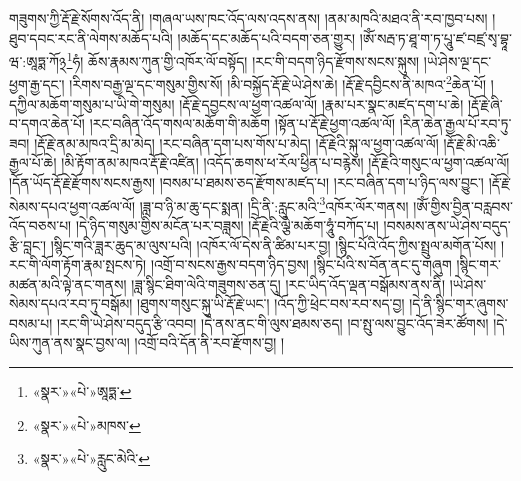 གཟུགས་ཀྱི་རྡོ་རྗེ་སོགས་འོད་ནི། །གཞལ་ཡས་ཁང་འོད་ལས་འདས་ནས། །ནམ་མཁའི་མཐའ་ནི་རབ་ཁྱབ་པས། །ཐུབ་དབང་རང་ནི་ལེགས་མཆོད་པའི། །མཆོད་དང་མཆོད་པའི་བདག་ཅན་གྱུར། །ཨོཾ་སརྦ་ཏ་ཐཱ་ག་ཏ་པཱུ་ཛ་བཛྲ་སྭ་བྷཱ་ཝ་:ཨཱཏྨ་ཀོ྅\footnote{«སྣར་»«པེ་»ཨཱཏྨ་}ཧཾ། ཆོས་རྣམས་ཀུན་གྱི་འཁོར་ལོ་བསྟོད། །རང་གི་བདག་ཉིད་རྫོགས་སངས་སྐུས། །ཡེ་ཤེས་ལྔ་དང་ཕྱག་རྒྱ་དང་། །རིགས་བརྒྱ་ལྔ་དང་གསུམ་གྱིས་སོ། །མི་བསྐྱོད་རྡོ་རྗེ་ཡེ་ཤེས་ཆེ། །རྡོ་རྗེ་དབྱིངས་ནི་མཁའ་\footnote{«སྣར་»«པེ་»མཁས་}ཆེན་པོ། །དཀྱིལ་མཆོག་གསུམ་པ་ཡི་གེ་གསུམ། །རྡོ་རྗེ་དབྱངས་ལ་ཕྱག་འཚལ་ལོ། །རྣམ་པར་སྣང་མཛད་དག་པ་ཆེ། །རྡོ་རྗེ་ཞི་བ་དགའ་ཆེན་པོ། །རང་བཞིན་འོད་གསལ་མཆོག་གི་མཆོག །སྟོན་པ་རྡོ་རྗེ་ཕྱག་འཚལ་ལོ། །རིན་ཆེན་རྒྱལ་པོ་རབ་ཏུ་ཟབ། །རྡོ་རྗེ་ནམ་མཁའ་དྲི་མ་མེད། །རང་བཞིན་དག་པས་གོས་པ་མེད། །རྡོ་རྗེའི་སྐུ་ལ་ཕྱག་འཚལ་ལོ། །རྡོ་རྗེ་མི་འཆི་རྒྱལ་པོ་ཆེ། །མི་རྟོག་ནམ་མཁའ་རྡོ་རྗེ་འཛིན། །འདོད་ཆགས་ཕ་རོལ་ཕྱིན་པ་བརྙེས། །རྡོ་རྗེའི་གསུང་ལ་ཕྱག་འཚལ་ལོ། །དོན་ཡོད་རྡོ་རྗེ་རྫོགས་སངས་རྒྱས། །བསམ་པ་ཐམས་ཅད་རྫོགས་མཛད་པ། །རང་བཞིན་དག་པ་ཉིད་ལས་བྱུང་། །རྡོ་རྗེ་སེམས་དཔའ་ཕྱག་འཚལ་ལོ། །ཟླ་བ་ཉི་མ་ཆུ་དང་སྨན། །དྲི་ནི་:རླུང་མའི་\footnote{«སྣར་»«པེ་»རླུང་མེའི་}འཁོར་ལོར་གནས། །ཨོཾ་གྱིས་བྱིན་བརླབས་འོད་བཅས་པ། །དེ་ཉིད་གསུམ་གྱིས་མངོན་པར་བཟླས། །རྡོ་རྗེའི་ལྕེ་མཆོག་ཧཱུཾ་བཀོད་པ། །བསམས་ནས་ཡེ་ཤེས་བདུད་རྩི་བླང་། །སྙིང་གའི་ཟླར་ཆུད་མ་ལུས་པའི། །འཁོར་ལོ་དེས་ནི་ཚིམ་པར་བྱ། །སྙིང་པོའི་འོད་ཀྱིས་སྤྲུལ་མགོན་པོས། །རང་གི་ལོག་རྟོག་རྣམ་སྤངས་ཏེ། །འགྲོ་བ་སངས་རྒྱས་བདག་ཉིད་བྱས། །སྙིང་པོའི་ས་བོན་ནང་དུ་གཞུག །སྙིང་གར་མཚན་མའི་ལྟེ་ནང་གནས། །ཟླ་སྙིང་ཐིག་ལེའི་གཟུགས་ཅན་དུ། །རང་ཡིད་འོད་ལྡན་བསྒོམས་ནས་ནི། །ཡེ་ཤེས་སེམས་དཔའ་རབ་ཏུ་བསྒོམ། །ཐུགས་གསུང་སྐུ་ཡི་རྡོ་རྗེ་ཡང་། །འོད་ཀྱི་ཕྲེང་བས་རབ་སད་བྱ། །དེ་ནི་སྙིང་གར་ཞུགས་བསམ་པ། །རང་གི་ཡེ་ཤེས་བདུད་རྩི་འབབ། །དེ་ནས་ནང་གི་ལུས་ཐམས་ཅད། །བ་སྤུ་ལས་བྱུང་འོད་ཟེར་ཚོགས། །དེ་ཡིས་ཀུན་ནས་སྣང་བྱས་ལ། །འགྲོ་བའི་དོན་ནི་རབ་རྫོགས་བྱ། །
